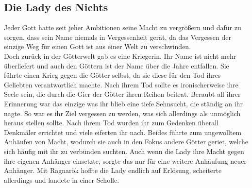 \documentclass[a4paper,12pt,oneside]{book}
\begin{document}
\subsection{Die Lady des Nichts}
Jeder Gott hatte seit jeher Ambitionen seine Macht zu vergrößern und dafür zu sorgen, dass sein Name niemals in Vergessenheit gerät, da das Vergessen der einzige Weg für einen Gott ist aus einer Welt zu verschwinden.
\\Doch zurück in der Götterwelt gab es eine Kriegerin. Ihr Name ist nicht mehr überliefert und auch den Göttern ist der Name über die Jahre entfallen. Sie führte einen Krieg gegen die Götter selbst, da sie diese für den Tod ihres Geliebten verantwortlich machte. Nach ihrem Tod sollte es ironischerweise ihre Seele sein, die durch die Gier der Götter ihren Reihen beitrat. Beraubt all ihrer Erinnerung war das einzige was ihr blieb eine tiefe Sehnsucht, die ständig an ihr nagte. So war es ihr Ziel vergessen zu werden, was sich allerdings als unmöglich heraus stellen sollte. Nach ihrem Tod wurden ihr zum Gedenken überall Denkmäler errichtet und viele eiferten ihr nach. Beides führte zum ungewolltem Anhäufen von Macht, wodurch sie auch in den Fokus andere Götter geriet, welche sich häufig mit ihr zu verbünden suchten. Auch wenn die Lady ihre Macht gegen ihre eigenen Anhänger einsetzte, sorgte das nur für eine weitere Anhäufung neuer Anhänger. Mit Ragnarök hoffte die Lady endlich auf Erlösung, scheiterte allerdings und landete in einer Scholle.
\end{document}
